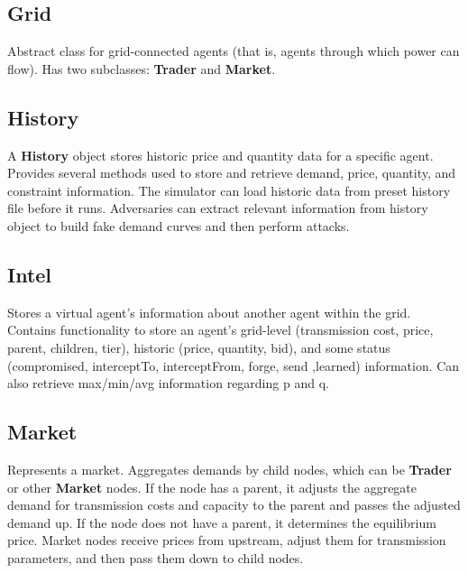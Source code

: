 \documentclass[12pt]{article}
\begin{document}
\subsection{Grid} \mbox{}
\label{subsec:objects_grid}

Abstract class for grid-connected agents (that is, agents through
which power can flow).  Has two subclasses: \textbf{Trader} and \textbf{Market}.

\subsection{History} \mbox{}
\label{subsec:objects_history}

A \textbf{History} object stores historic price and quantity data for a specific 
agent. Provides several methods used to store and retrieve demand, 
price, quantity, and constraint information. The simulator can load historic 
data from preset history file before it runs. Adversaries can extract 
relevant information from history object to build fake demand curves 
and then perform attacks.

\subsection{Intel} \mbox{}
\label{subsec:objects_intel}

Stores a virtual agent's information about another agent within the grid. 
Contains functionality to store an agent's 
grid-level (transmission cost, price, parent, children, tier), 
historic (price, quantity, bid), and some status (compromised, interceptTo, 
interceptFrom, forge, send ,learned) information. Can also 
retrieve max/min/avg information regarding p and q.

\subsection{Market} \mbox{}
\label{subsec:objects_market}

Represents a market.  Aggregates demands by child nodes, which can be 
\textbf{Trader} or other \textbf{Market} nodes. If the node has a parent, it adjusts 
the aggregate demand for transmission costs and capacity to the parent
and passes the adjusted demand up.  If the node does not have a parent, 
it determines the equilibrium price.  Market nodes receive prices from 
upstream, adjust them for transmission parameters, and then pass them 
down to child nodes.
\end{document}
